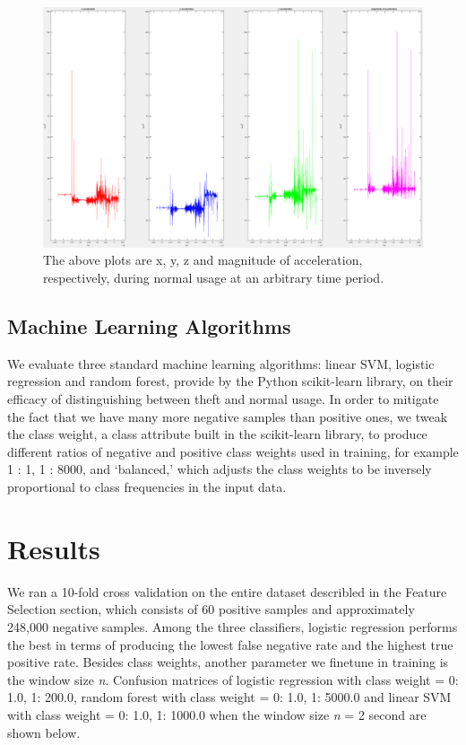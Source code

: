 \documentclass{soups}
\begin{document}
\begin{figure}[H]
\includegraphics[width=1.0\columnwidth]{neg_acc_separated.png}
\caption{The above plots are x, y, z and magnitude of acceleration, respectively, during normal usage at an arbitrary time period.}
\end{figure}



\subsection{Machine Learning Algorithms}
We evaluate three standard machine learning algorithms: linear SVM, logistic regression and random forest, provide by the Python scikit-learn library, on their efficacy of distinguishing between theft and normal usage. In order to mitigate the fact that we have many more negative samples than positive ones, we tweak the class weight, a class attribute built in the scikit-learn library, to produce different ratios of negative and positive class weights used in training, for example 1 : 1, 1 : 8000, and `balanced,' which adjusts the class weights to be inversely proportional to class frequencies in the input data.



\section{Results}
We ran a 10-fold cross validation on the entire dataset describled in the Feature Selection section, which consists of 60 positive samples and approximately 248,000 negative samples. Among the three classifiers, logistic regression performs the best in terms of producing the lowest false negative rate and the highest true positive rate. Besides class weights, another parameter we finetune in training is the window size \textit{n}. Confusion matrices of logistic regression with class weight = {0: 1.0, 1: 200.0}, random forest with class weight = {0: 1.0, 1: 5000.0} and linear SVM with class weight = {0: 1.0, 1: 1000.0} when the window size \textit{n} = 2 second are shown below.
\end{document}
